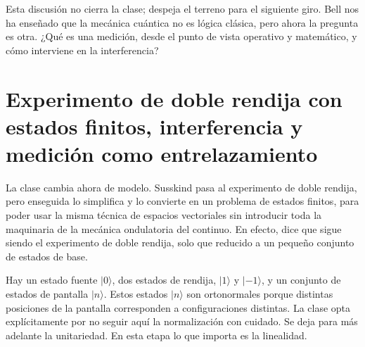 \begin{classroomqa}\end{classroomqa}

Esta discusión no cierra la clase; despeja el terreno para el siguiente giro. Bell nos ha enseñado que la mecánica cuántica no es lógica clásica, pero ahora la pregunta es otra. ¿Qué es una medición, desde el punto de vista operativo y matemático, y cómo interviene en la interferencia?

\section{Experimento de doble rendija con estados finitos, interferencia y medición como entrelazamiento}

La clase cambia ahora de modelo. Susskind pasa al experimento de doble rendija, pero enseguida lo simplifica y lo convierte en un problema de estados finitos, para poder usar la misma técnica de espacios vectoriales sin introducir toda la maquinaria de la mecánica ondulatoria del continuo. En efecto, dice que sigue siendo el experimento de doble rendija, solo que reducido a un pequeño conjunto de estados de base.

Hay un estado fuente \(|0\rangle\), dos estados de rendija, \(|1\rangle\) y \(|-1\rangle\), y un conjunto de estados de pantalla \(|n\rangle\). Estos estados \(|n\rangle\) son ortonormales porque distintas posiciones de la pantalla corresponden a configuraciones distintas. La clase opta explícitamente por no seguir aquí la normalización con cuidado. Se deja para más adelante la unitariedad. En esta etapa lo que importa es la linealidad.

